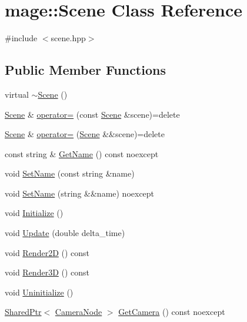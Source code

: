 \hypertarget{classmage_1_1_scene}{}\section{mage\+:\+:Scene Class Reference}
\label{classmage_1_1_scene}


{\ttfamily \#include $<$scene.\+hpp$>$}

\subsection*{Public Member Functions}
\begin{DoxyCompactItemize}
\item 
virtual \hyperlink{classmage_1_1_scene_adc40910fdca62586659c2961fe7e7f3c}{$\sim$\+Scene} ()
\item 
\hyperlink{classmage_1_1_scene}{Scene} \& \hyperlink{classmage_1_1_scene_a2c25c0fedc0230771d8c00a8288a69ce}{operator=} (const \hyperlink{classmage_1_1_scene}{Scene} \&scene)=delete
\item 
\hyperlink{classmage_1_1_scene}{Scene} \& \hyperlink{classmage_1_1_scene_a400926762670c9cd9b6d456291600f53}{operator=} (\hyperlink{classmage_1_1_scene}{Scene} \&\&scene)=delete
\item 
const string \& \hyperlink{classmage_1_1_scene_a6afd25c30d08eb579eb430af49cf8fc0}{Get\+Name} () const noexcept
\item 
void \hyperlink{classmage_1_1_scene_a9b7c1c2f84cc3b3c5ff3de4f29d830e9}{Set\+Name} (const string \&name)
\item 
void \hyperlink{classmage_1_1_scene_a86b2e6e764ee134af1706f90603a6596}{Set\+Name} (string \&\&name) noexcept
\item 
void \hyperlink{classmage_1_1_scene_a3cd12ef381ca743bf0b8f8aa2a76eb57}{Initialize} ()
\item 
void \hyperlink{classmage_1_1_scene_aa10e6eafc00834f63f146589326cbfe2}{Update} (double delta\+\_\+time)
\item 
void \hyperlink{classmage_1_1_scene_a53487349d68f0ffcc91b243d0cfb86a3}{Render2D} () const
\item 
void \hyperlink{classmage_1_1_scene_a51d2d441067d30cf3a444d6a80811f93}{Render3D} () const
\item 
void \hyperlink{classmage_1_1_scene_a714dc33c04dc2b8e2cec93564905b174}{Uninitialize} ()
\item 
\hyperlink{namespacemage_a1e01ae66713838a7a67d30e44c67703e}{Shared\+Ptr}$<$ \hyperlink{classmage_1_1_camera_node}{Camera\+Node} $>$ \hyperlink{classmage_1_1_scene_ad77fe833ca79bf862e1929dfdeb0f1fd}{Get\+Camera} () const noexcept

\end{DoxyCompactItemize}
